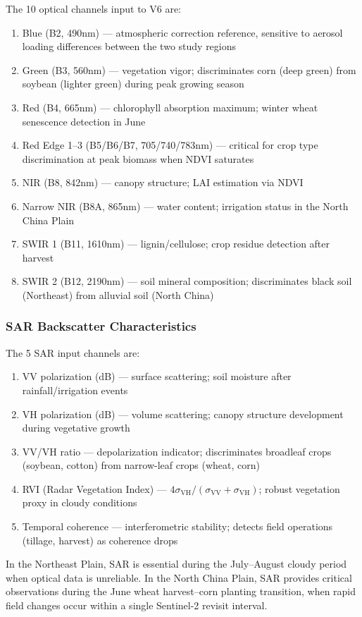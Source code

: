 The 10 optical channels input to V6 are:
\begin{enumerate}[nosep]
    \item Blue (B2, 490nm) — atmospheric correction reference, sensitive to
    aerosol loading differences between the two study regions
    \item Green (B3, 560nm) — vegetation vigor; discriminates corn (deep green)
    from soybean (lighter green) during peak growing season
    \item Red (B4, 665nm) — chlorophyll absorption maximum; winter wheat
    senescence detection in June
    \item Red Edge 1--3 (B5/B6/B7, 705/740/783nm) — critical for crop type
    discrimination at peak biomass when NDVI saturates
    \item NIR (B8, 842nm) — canopy structure; LAI estimation via NDVI
    \item Narrow NIR (B8A, 865nm) — water content; irrigation status in
    the North China Plain
    \item SWIR 1 (B11, 1610nm) — lignin/cellulose; crop residue detection
    after harvest
    \item SWIR 2 (B12, 2190nm) — soil mineral composition; discriminates
    black soil (Northeast) from alluvial soil (North China)
\end{enumerate}

\subsubsection{SAR Backscatter Characteristics}

The 5 SAR input channels are:
\begin{enumerate}[nosep]
    \item VV polarization (dB) — surface scattering; soil moisture after
    rainfall/irrigation events
    \item VH polarization (dB) — volume scattering; canopy structure
    development during vegetative growth
    \item VV/VH ratio — depolarization indicator; discriminates broadleaf
    crops (soybean, cotton) from narrow-leaf crops (wheat, corn)
    \item RVI (Radar Vegetation Index) — $4\sigma_{\text{VH}}/(\sigma_{\text{VV}} +
    \sigma_{\text{VH}})$; robust vegetation proxy in cloudy conditions
    \item Temporal coherence — interferometric stability; detects field
    operations (tillage, harvest) as coherence drops
\end{enumerate}

In the Northeast Plain, SAR is essential during the July--August cloudy period
when optical data is unreliable. In the North China Plain, SAR provides
critical observations during the June wheat harvest--corn planting transition,
when rapid field changes occur within a single Sentinel-2 revisit interval.
